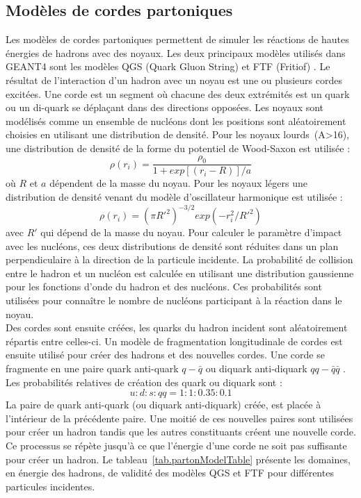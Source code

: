\subsection{Modèles de cordes partoniques}
\label{sec.parton}
Les modèles de cordes partoniques permettent de simuler les réactions de hautes énergies de hadrons avec des noyaux. Les deux principaux modèles utilisés dans GEANT4 sont les modèles QGS (Quark Gluon String) et FTF (Fritiof) \cite{geant4_parton}. Le résultat de l'interaction d'un hadron avec un noyau est une ou plusieurs cordes excitées. Une corde est un segment où chacune des deux extrémités est un quark ou un di-quark se déplaçant dans des directions opposées. Les noyaux sont modélisés comme un ensemble de nucléons dont les positions sont aléatoirement choisies en utilisant une distribution de densité. Pour les noyaux lourds~(A>16), une distribution de densité de la forme du potentiel de Wood-Saxon est utilisée : 
\begin{equation}
  \label{eq.wood-saxon}
  \rho(r_i)=\frac{\rho_0}{1+exp[(r_i-R)]/a}
\end{equation}
où $R$ et $a$ dépendent de la masse du noyau. Pour les noyaux légers une distribution de densité venant du modèle d'oscillateur harmonique est utilisée : 
\begin{equation}
  \label{eq.harmonic-ocsillator}
  \rho(r_i)=(\pi R'^2)^{-3/2}exp(-r_i^2/R'^2)
\end{equation}
avec $R'$  qui dépend de la masse du noyau.
Pour calculer le paramètre d'impact avec les nucléons, ces deux distributions de densité sont réduites dans un plan perpendiculaire à la direction de la particule incidente. La probabilité de collision entre le hadron et un nucléon est calculée en utilisant une distribution gaussienne pour les fonctions d'onde du hadron et des nucléons. Ces probabilités sont utilisées pour connaître le nombre de nucléons participant à la réaction dans le noyau.\\
Des cordes sont ensuite créées, les quarks du hadron incident sont aléatoirement répartis entre celles-ci. Un modèle de fragmentation longitudinale de cordes est ensuite utilisé pour créer des hadrons et des nouvelles cordes. Une corde se fragmente en une paire quark anti-quark $q-\bar q$ ou diquark anti-diquark $qq-\bar q \bar q$ \cite{geant4_reference}. Les probabilités relatives de création des quark ou diquark sont :
\begin{equation}
  u:d:s:qq = 1:1:0.35:0.1
\end{equation}
La paire de quark anti-quark (ou diquark anti-diquark) créée, est placée à l'intérieur de la précédente paire. Une moitié de ces nouvelles paires sont utilisées pour créer un hadron tandis que les autres constituants créent une nouvelle corde. Ce processus se répète jusqu'à ce que l'énergie d'une corde ne soit pas suffisante pour créer un hadron. Le tableau~\ref{tab.partonModelTable} présente les domaines, en énergie des hadrons, de validité des modèles QGS et FTF pour différentes particules incidentes.
